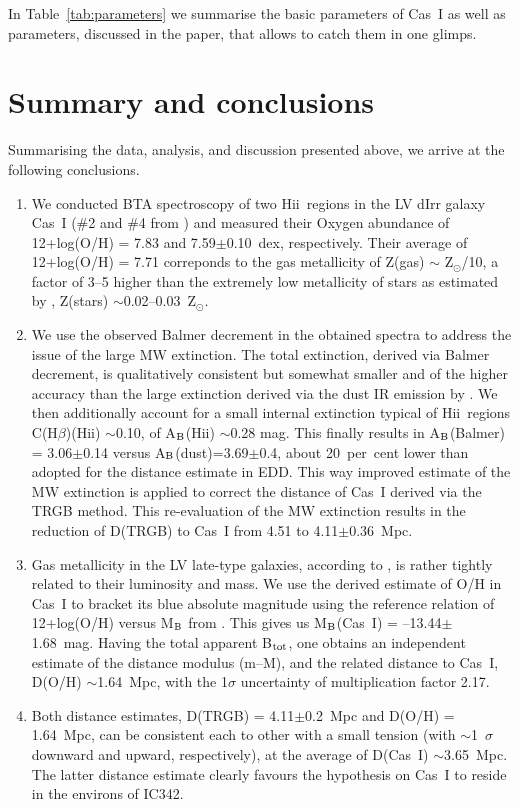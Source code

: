 \documentclass[useAMS,usenatbib]{mn2e}
\newcommand{\HII}{H{\sc ii}}
\newcommand{\sunn}{$_{\odot}$}
\begin{document}
In Table~\ref{tab:parameters} we summarise the basic parameters of Cas~I as well as parameters, discussed in the paper,
that allows to catch them in one glimps.

\section[]{Summary and conclusions}
\label{sec:summary}

Summarising the  data, analysis, and discussion presented above, we arrive
at the following conclusions.

\begin{enumerate}
\item
We conducted BTA spectroscopy of two \HII\ regions in the LV dIrr galaxy Cas~I
($\#$2 and $\#$4 from \citet{Tikhonov19})
and measured their Oxygen abundance of 12+log(O/H) = 7.83 and 7.59$\pm$0.10~dex,
respectively. Their average of 12+log(O/H) = 7.71 correponds to the gas metallicity of Z(gas) $\sim$ Z\sunn/10,
a factor of 3--5 higher than the extremely low metallicity of stars as estimated by \citet{Tikhonov19}, Z(stars)
$\sim$0.02--0.03~Z\sunn.
\item
We use the observed Balmer decrement in the obtained spectra to address the issue of the large MW extinction.
The total extinction, derived via Balmer decrement, is qualitatively consistent but somewhat smaller and of the higher
accuracy than the large extinction derived via the dust IR emission by \citet{Schlegel98, Schlafly11}.
We then additionally account for a small internal extinction typical of \HII\ regions C(H$\beta$)(\HII) $\sim$0.10,
of A$_{\rm B}$(\HII) $\sim$0.28 mag. This finally results in A$_{\rm B}$(Balmer) = 3.06$\pm$0.14
versus A$_{\rm B}$(dust)=3.69$\pm$0.4, about 20~per~cent lower than adopted for the distance estimate in EDD.
This way improved estimate of the MW extinction is applied to correct the distance of Cas~I derived via the TRGB method.
This re-evaluation of the MW extinction results in the reduction of D(TRGB) to Cas~I from 4.51 to 4.11$\pm$0.36~Mpc.
\item
Gas metallicity in the LV late-type galaxies, according to \citet{Berg12}, is rather tightly related to
their luminosity and mass. We use the derived estimate of O/H in Cas~I to bracket its blue absolute magnitude using
the reference relation of 12+log(O/H) versus M$_{\rm B}$ from \citet{Berg12}. This gives us M$_{\rm B}$(Cas~I) =
--13.44$\pm$1.68~mag. Having the total apparent B$_{\rm tot}$, one obtains an independent estimate of the distance
modulus (m--M), and the related distance to Cas~I, D(O/H) $\sim$1.64~Mpc, with the 1$\sigma$ uncertainty of multiplication
factor 2.17.
\item
Both distance estimates, D(TRGB) = 4.11$\pm$0.2~Mpc and D(O/H) = 1.64~Mpc, can be consistent each to other with
a small tension (with $\sim$1~$\sigma$ downward and upward, respectively), at the average of D(Cas~I) $\sim$3.65~Mpc.
The latter distance estimate clearly favours the hypothesis on Cas~I to reside in the environs of IC342.
\end{enumerate}
\end{document}
